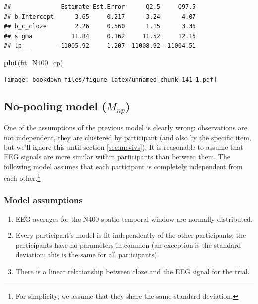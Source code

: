 \documentclass[12pt,]{krantz}
\newenvironment{Shaded}{\begin{snugshade}}{\end{snugshade}}
\newcommand{\KeywordTok}[1]{\textcolor[rgb]{0.13,0.29,0.53}{\textbf{#1}}}
\newcommand{\NormalTok}[1]{#1}
\providecommand{\tightlist}{%
  \setlength{\itemsep}{0pt}\setlength{\parskip}{0pt}}
\theoremstyle{definition}
\theoremstyle{definition}
\theoremstyle{definition}
\theoremstyle{remark}
\begin{document}
\begin{verbatim}
##              Estimate Est.Error      Q2.5     Q97.5
## b_Intercept      3.65     0.217      3.24      4.07
## b_c_cloze        2.26     0.560      1.15      3.36
## sigma           11.84     0.162     11.52     12.16
## lp__        -11005.92     1.207 -11008.92 -11004.51
\end{verbatim}

\begin{Shaded}
\begin{Highlighting}[]
\KeywordTok{plot}\NormalTok{(fit_N400_cp)}
\end{Highlighting}
\end{Shaded}

\texttt{[image: bookdown\_files/figure-latex/unnamed-chunk-141-1.pdf]}

\subsection{\texorpdfstring{No-pooling model
(\(M_{np}\))}{No-pooling model (M\_\{np\})}}\label{no-pooling-model-m_np}

One of the assumptions of the previous model is clearly wrong:
observations are not independent, they are clustered by participant (and
also by the specific item, but we'll ignore this until section
\ref{sec:mcvivs}). It is reasonable to assume that EEG signals are more
similar within participants than between them. The following model
assumes that each participant is completely independent from each
other.\footnote{For simplicity, we assume that they share the same
  standard deviation.}

\subsubsection{Model assumptions}\label{model-assumptions-1}

\begin{enumerate}
\def\labelenumi{\arabic{enumi}.}
\tightlist
\item
  EEG averages for the N400 spatio-temporal window are normally
  distributed.
\item
  Every participant's model is fit independently of the other
  participants; the participants have no parameters in common (an
  exception is the standard deviation; this is the same for all
  participants).
\item
  There is a linear relationship between cloze and the EEG signal for
  the trial.
\end{enumerate}
\end{document}
